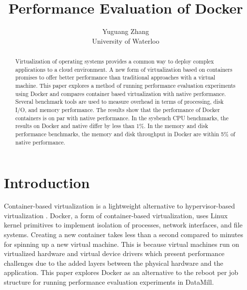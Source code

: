 \documentclass[11pt]{article}
\begin{document}
	
	\thispagestyle{empty}
	
	\title{Performance Evaluation of Docker}
	
	\author{Yuguang Zhang \\ University of Waterloo}
	
	\maketitle
	

\begin{abstract}
Virtualization of operating systems provides a common way to deploy complex
applications to a cloud environment. A new form of virtualization based on containers
promises to offer better performance than traditional approaches with a virtual machine.
This paper explores a method of running performance evaluation experiments using
Docker and compares container based virtualization with native performance. Several
benchmark tools are used to measure overhead in terms of processing, disk I/O,
and memory performance. The results show that the performance of Docker containers is on par with native performance. In the sysbench CPU benchmarks, the results on Docker and native differ by less than 1\%. In the memory and disk performance benchmarks, the memory and disk throughput in Docker are within 5\% of native performance.
\end{abstract}

\section{Introduction}
Container-based virtualization is a lightweight alternative to hypervisor-based virtualization \cite{morabito}. Docker, a form of container-based virtualization, uses Linux kernel primitives to implement isolation of processes, network interfaces, and file systems. Creating a new container takes less than a second compared to minutes for spinning up a new virtual machine. This is because virtual machines run on virtualized hardware and virtual device drivers which present performance challenges due to the added layers between the physical hardware and the application. This paper explores Docker as an alternative to the reboot per job structure for running performance evaluation experiments in DataMill.
\end{document}
